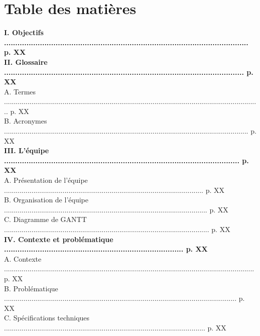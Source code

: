 \documentclass[a4paper,11pt]{book}
\begin{document}
	
	
	\maketitle
\section*{Table des matières}
\begin{tabbing}
\textbf{{I. Objectifs ............................................................................................................. p. XX}}\\
\textbf{{II. Glossaire ........................................................................................................... p. XX}}\\
A. Termes ................................................................................................................................... p. XX\\
B. Acronymes ............................................................................................................................. p. XX\\
\textbf{{III. L'équipe ......................................................................................................... p. XX}}\\
A. Présentation de l'équipe ...................................................................................................... p. XX\\
B. Organisation de l'équipe ........................................................................................................ p. XX\\
C. Diagramme de GANTT ......................................................................................................... p. XX\\
\textbf{{IV. Contexte et problématique ................................................................................ p. XX}} \\
A. Contexte ................................................................................................................................ p. XX\\
B. Problématique ....................................................................................................................... p. XX\\
C. Spécifications techniques ....................................................................................................... p. XX\\

\end{tabbing}
\end{document}
